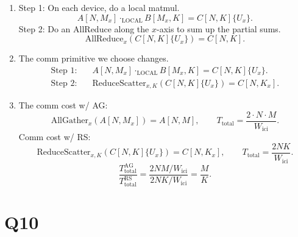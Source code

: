 \documentclass[11pt]{article}
\newcommand{\Ttotal}{T_{\text{total}}}
\newcommand{\Wici}{W_{\text{ici}}}
\begin{document}
\begin{enumerate}
  \item Step 1: On each device, do a local matmul.
  \[
  A[N, M_x] \cdot_{\text{LOCAL}} B[M_x, K] = C[N, K]\{U_x\}.
  \]
  Step 2: Do an AllReduce along the $x$-axis to sum up the partial sums.
  \[
  \text{AllReduce}_x(C[N, K]\{U_x\}) = C[N, K].
  \]

  \item The comm primitive we choose changes.
  \begin{align*}
  \text{Step 1:} \quad & A[N, M_x] \cdot_{\text{LOCAL}} B[M_x, K] = C[N, K]\{U_x\}. \\
  \text{Step 2:} \quad & \text{ReduceScatter}_{x, K}(C[N, K]\{U_x\}) = C[N, K_x].
  \end{align*}

  \item The comm cost w/ AG:
  \[
  \text{AllGather}_x(A[N, M_x]) = A[N, M], \qquad \Ttotal = \frac{2 \cdot N \cdot M}{\Wici}.
  \]
  Comm cost w/ RS:
  \[
  \text{ReduceScatter}_{x, K}(C[N, K]\{U_x\}) = C[N, K_x], \qquad \Ttotal = \frac{2NK}{\Wici}.
  \]
  \[
  \frac{\Ttotal^{\text{AG}}}{\Ttotal^{\text{RS}}} = \frac{2NM / \Wici}{2NK / \Wici} = \frac{M}{K}.
  \]
\end{enumerate}

\section*{Q10}
\end{document}
